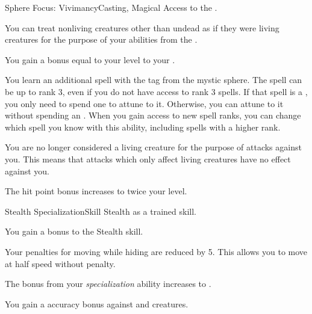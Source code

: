     \begin{magicalfeat}{Sphere Focus: Vivimancy}{Casting, Magical}
        \featpre Access to the  .

         You can treat nonliving creatures other than undead as if they were living creatures for the purpose of your abilities from the  .

         You gain a bonus equal to your level to your .

         You learn an additional spell with the  tag from the  mystic sphere.
        The spell can be up to rank 3, even if you do not have access to rank 3 spells.
        If that spell is a , you only need to spend one  to attune to it.
        Otherwise, you can attune to it without spending an .
        When you gain access to new spell ranks, you can change which spell you know with this ability, including spells with a higher rank.

         You are no longer considered a living creature for the purpose of attacks against you.
        This means that attacks which only affect living creatures have no effect against you.

         The hit point bonus increases to twice your level.
    \end{magicalfeat}

    \begin{feat}{Stealth Specialization}{Skill}
        \featpre Stealth as a trained skill.

         You gain a  bonus to the Stealth skill.

         Your penalties for moving while hiding are reduced by 5.
        This allows you to move at half speed without penalty.

         The bonus from your \textit{specialization} ability increases to .

         You gain a  accuracy bonus against \unaware and \partiallyunaware creatures.
    \end{feat}

